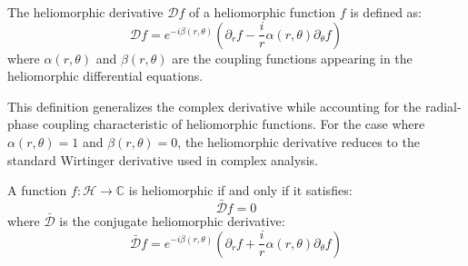 \begin{definition}
The heliomorphic derivative $\mathcal{D}f$ of a heliomorphic function $f$ is defined as:
\begin{equation}
\mathcal{D}f = e^{-i\beta(r,\theta)}\left(\partial_r f - \frac{i}{r}\alpha(r,\theta)\partial_\theta f\right)
\end{equation}
where $\alpha(r,\theta)$ and $\beta(r,\theta)$ are the coupling functions appearing in the heliomorphic differential equations.
\end{definition}

This definition generalizes the complex derivative while accounting for the radial-phase coupling characteristic of heliomorphic functions. For the case where $\alpha(r,\theta) = 1$ and $\beta(r,\theta) = 0$, the heliomorphic derivative reduces to the standard Wirtinger derivative used in complex analysis.

\begin{theorem}
A function $f: \mathcal{H} \rightarrow \mathbb{C}$ is heliomorphic if and only if it satisfies:
\begin{equation}
\bar{\mathcal{D}}f = 0
\end{equation}
where $\bar{\mathcal{D}}$ is the conjugate heliomorphic derivative:
\begin{equation}
\bar{\mathcal{D}}f = e^{-i\beta(r,\theta)}\left(\partial_r f + \frac{i}{r}\alpha(r,\theta)\partial_\theta f\right)
\end{equation}
\end{theorem}

